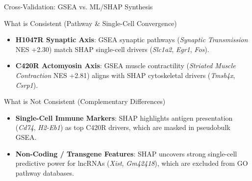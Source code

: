 \documentclass[10pt, aspectratio=169]{beamer}
\begin{document}
\begin{frame}{Cross-Validation: GSEA vs. ML/SHAP Synthesis}
  \begin{block}{What is Consistent (Pathway \& Single-Cell Convergence)}
    \begin{itemize}
      \item \textbf{H1047R Synaptic Axis}: GSEA synaptic pathways (\emph{Synaptic Transmission} NES +2.30) match SHAP single-cell drivers (\emph{Slc1a2}, \emph{Egr1}, \emph{Fos}).
      \item \textbf{C420R Actomyosin Axis}: GSEA muscle contractility (\emph{Striated Muscle Contraction} NES +2.81) aligns with SHAP cytoskeletal drivers (\emph{Tmsb4x}, \emph{Csrp1}).
    \end{itemize}
  \end{block}

  \begin{block}{What is Not Consistent (Complementary Differences)}
    \begin{itemize}
      \item \textbf{Single-Cell Immune Markers}: SHAP highlights antigen presentation (\emph{Cd74}, \emph{H2-Eb1}) as top C420R drivers, which are masked in pseudobulk GSEA.
      \item \textbf{Non-Coding / Transgene Features}: SHAP uncovers strong single-cell predictive power for lncRNAs (\emph{Xist}, \emph{Gm42418}), which are excluded from GO pathway databases.
    \end{itemize}
  \end{block}
\end{frame}
\end{document}
